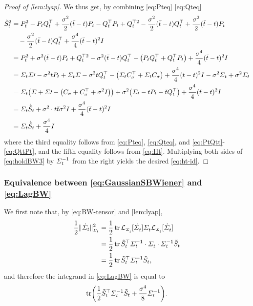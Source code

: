 \begin{proof}[Proof of \cref{lem:lyap}]
We thus get, by combining \eqref{eq:Pteq} \eqref{eq:Qteq}
\begin{align}
\nn
\Ht^2 &= \Pt^2 -\Pt \Qt^\top + \frac{\sdev^2}{2}(\ctimebar-\ctime) \Pt -\Qt^\top \Pt + \Qt^{\top2} - \frac{\sdev^2}{2}(\ctimebar-\ctime)\Qt^\top +  \frac{\sdev^2}{2}(\ctimebar-\ctime)\Pt \\
	& \enspace\enspace -  \frac{\sdev^2}{2}(\ctimebar-\ctime)\Qt^\top + \frac{\sdev^4}{4}(\ctimebar-\ctime)^2\eye \\
\nn
&= \Pt^2 + \sdev^2(\ctimebar-\ctime)\Pt + \Qt^{\top2} - \sdev^2(\ctimebar-\ctime)\Qt^\top - \parens*{ \Pt\Qt^\top + \Qt^\top \Pt }  + \frac{\sdev^4}{4}(\ctimebar-\ctime)^2\eye\\
\nn
&= \Sigcurve\Sigma\prime - \sdev^2\ctime\Pt + \Sigcurve \Sigma - \sdev^2 \ctimebar\Qt^\top - \parens*{  \Sigcurve \C^\top + \Sigcurve \C }  + \frac{\sdev^4}{4}(\ctimebar-\ctime)^2\eye - \sdev^2 \Sigcurve + \sdev^2\Sigcurve\\
\nn
&= \Sigcurve\parens*{  \Sigma + \Sigma\prime - \parens*{\C + \C^\top + \sdev^2\eye }} + \sdev^2 \parens*{\Sigcurve -  \ctime\Pt - \ctimebar\Qt^\top }+ \frac{\sdev^4}{4}(\ctimebar-\ctime)^2\eye  \\
\nn 
&= \Sigcurve \dHt + \sdev^2 \cdot\ctime\ctimebar\sdev^2 \eye +  \frac{\sdev^4}{4}(\ctimebar-\ctime)^2\eye \\
\label{eq:holdBW3}
&= \Sigcurve \dHt + \frac{\sdev^4}{4}\eye
\end{align}
where the third equality follows from \eqref{eq:Pteq}, \eqref{eq:Qteq}, and \eqref{eq:PtQtt}-\eqref{eq:QttPt}, and the fifth equality follows from \eqref{eq:Ht}. Multiplying both sides of \eqref{eq:holdBW3} by $\Sigma^{-1}_{t}$ from the right yields the desired \eqref{eq:ht-id}. 
\end{proof}


\subsubsection{Equivalence between \eqref{eq:GaussianSBWiener} and \eqref{eq:LagBW}}

We first note that, by \eqref{eq:BW-tensor} and \cref{lem:lyap},
\begin{align}
\nn
\kenergyBW &= \frac{1}{2}\tr \lyap \Sigmasol \lyap \\
\nn
&= \frac{1}{2}\tr \Ht^\top \Sigmasolinv \cdot \Sigmasol \cdot \Sigmasolinv \Ht \\
&= \frac{1}{2} \tr \Ht^\top\Sigmasolinv\Ht,
\end{align}and therefore the integrand in \eqref{eq:LagBW} is equal to
\begin{align}
\label{eq:holdBW2}
\tr \parens*{   \frac{1}{2} \Ht^\top\Sigmasolinv\Ht + \frac{\sdev^4}{8} \Sigcurveinv}.
\end{align}


